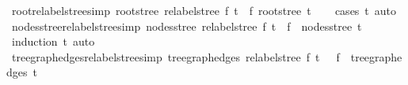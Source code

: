 \begin{isabellebody}
\endisatagproof
{\isafoldproof}%
%
\isadelimproof
\isanewline
%
\endisadelimproof
\isanewline
{}\isamarkupfalse%
\ root{\isacharunderscore}{\kern0pt}relabel{\isacharunderscore}{\kern0pt}stree{\isacharbrackleft}{\kern0pt}simp{\isacharbrackright}{\kern0pt}{\isacharcolon}{\kern0pt}\ {\isachardoublequoteopen}root{\isacharunderscore}{\kern0pt}stree\ {\isacharparenleft}{\kern0pt}relabel{\isacharunderscore}{\kern0pt}stree\ f\ t{\isacharparenright}{\kern0pt}\ {\isacharequal}{\kern0pt}\ f\ {\isacharparenleft}{\kern0pt}root{\isacharunderscore}{\kern0pt}stree\ t{\isacharparenright}{\kern0pt}{\isachardoublequoteclose}\isanewline
%
\isadelimproof
\ \ %
\endisadelimproof
%
\isatagproof
{}\isamarkupfalse%
\ {\isacharparenleft}{\kern0pt}cases\ t{\isacharparenright}{\kern0pt}\ auto%
\endisatagproof
{\isafoldproof}%
%
\isadelimproof
\isanewline
%
\endisadelimproof
\isanewline
{}\isamarkupfalse%
\ nodes{\isacharunderscore}{\kern0pt}stree{\isacharunderscore}{\kern0pt}relabel{\isacharunderscore}{\kern0pt}stree{\isacharbrackleft}{\kern0pt}simp{\isacharbrackright}{\kern0pt}{\isacharcolon}{\kern0pt}\ {\isachardoublequoteopen}nodes{\isacharunderscore}{\kern0pt}stree\ {\isacharparenleft}{\kern0pt}relabel{\isacharunderscore}{\kern0pt}stree\ f\ t{\isacharparenright}{\kern0pt}\ {\isacharequal}{\kern0pt}\ f\ {\isacharbackquote}{\kern0pt}\ nodes{\isacharunderscore}{\kern0pt}stree\ t{\isachardoublequoteclose}\isanewline
%
\isadelimproof
\ \ %
\endisadelimproof
%
\isatagproof
{}\isamarkupfalse%
\ {\isacharparenleft}{\kern0pt}induction\ t{\isacharparenright}{\kern0pt}\ auto%
\endisatagproof
{\isafoldproof}%
%
\isadelimproof
\isanewline
%
\endisadelimproof
\isanewline
{}\isamarkupfalse%
\ tree{\isacharunderscore}{\kern0pt}graph{\isacharunderscore}{\kern0pt}edges{\isacharunderscore}{\kern0pt}relabel{\isacharunderscore}{\kern0pt}stree{\isacharbrackleft}{\kern0pt}simp{\isacharbrackright}{\kern0pt}{\isacharcolon}{\kern0pt}\ {\isachardoublequoteopen}tree{\isacharunderscore}{\kern0pt}graph{\isacharunderscore}{\kern0pt}edges\ {\isacharparenleft}{\kern0pt}relabel{\isacharunderscore}{\kern0pt}stree\ f\ t{\isacharparenright}{\kern0pt}\ {\isacharequal}{\kern0pt}\ {\isacharparenleft}{\kern0pt}{\isacharparenleft}{\kern0pt}{\isacharbackquote}{\kern0pt}{\isacharparenright}{\kern0pt}\ f{\isacharparenright}{\kern0pt}\ {\isacharbackquote}{\kern0pt}\ tree{\isacharunderscore}{\kern0pt}graph{\isacharunderscore}{\kern0pt}edges\ t{\isachardoublequoteclose}\isanewline
%
\isadelimproof
\ \ %
\endisadelimproof
%
\isatagproof
{}\isamarkupfalse%

\end{isabellebody}

